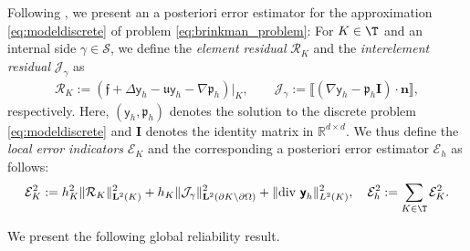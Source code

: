 \documentclass[final]{siamart0216}
\begin{document}
Following \cite{MR1445736,MR1259620}, we present an a posteriori error estimator for the approximation \eqref{eq:modeldiscrete} of problem \eqref{eq:brinkman_problem}: For $K\in \T$ and an internal side $\gamma\in\mathscr{S}$, we define the \emph{element residual} $\mathcal{R}_K$ and the \emph{interelement residual} $\mathcal{J}_{\gamma}$ as
\begin{align}\label{eq:residuals}
\mathcal{R}_K:= (\boldsymbol{\mathfrak{f}}+\Delta \boldsymbol{\mathsf{y}}_{h}\!-\mathfrak{u}\boldsymbol{\mathsf{y}}_{h}\!-\!\nabla\mathfrak{p}_{h})|_K,
\qquad 
\mathcal{J}_{\gamma}:= \llbracket(\nabla \boldsymbol{\mathsf{y}}_{h}-\mathfrak{p}_{h}\mathbf{I})\cdot \mathbf{n}\rrbracket,
\end{align}
respectively. Here, $(\boldsymbol{\mathsf{y}}_{h},\mathfrak{p}_{h})$ denotes the solution to the discrete problem \eqref{eq:modeldiscrete} and $\mathbf{I}$ denotes the identity matrix in $\mathbb{R}^{d\times d}$. We thus define the \emph{local error indicators} $\mathcal{E}_{K}$ and the corresponding a posteriori error estimator $\mathcal{E}_{h}$ as follows:
\begin{align}\label{eq:indicator_estimator_e}
\mathcal{E}_{K}^2:=h_K^2  \|\mathcal{R}_K\|_{\mathbf{L}^2(K)}^2
+h_K  \|\mathcal{J}_{\gamma} \|_{\mathbf{L}^2(\partial K\setminus\partial \Omega)}^2+\|\text{div }\boldsymbol{\mathsf{y}}_{h}\|_{L^2(K)}^2,
\quad 
\mathcal{E}_{h}^2:= \sum_{K\in\T}\mathcal{E}_{K}^2.
\end{align}

We present the following global reliability result.
\end{document}
